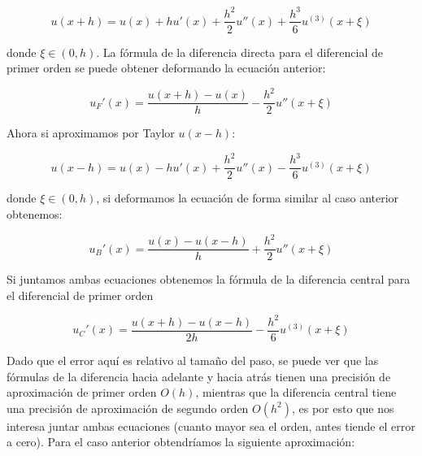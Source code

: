 \documentclass[12pt]{article}
\begin{document}
\begin{equation*}
u(x+h)=u(x) + hu'(x)+ \frac{h^2}{2}  u''(x)+ \frac{h^3}{6} u^{(3)}(x+\xi) 
\end{equation*}

donde $\xi\in (0,h)$. La fórmula de la diferencia directa para el diferencial de primer orden se puede obtener deformando la ecuación anterior:

\begin{equation}
u_F'(x)=\frac{u(x+h)-u(x)}{h} - \frac{h^2}{2}u''(x+\xi)
\end{equation}

Ahora si aproximamos por Taylor $u(x-h)$:

\begin{equation*}
u(x-h)=u(x) - hu'(x)+ \frac{h^2}{2}  u''(x) - \frac{h^3}{6} u^{(3)}(x+\xi)
\end{equation*}

donde $\xi\in (0,h)$, si deformamos la ecuación de forma similar al caso anterior obtenemos:

\begin{equation}
u_B'(x)=\frac{u(x)-u(x-h)}{h} + \frac{h^2}{2}u''(x+\xi)
\end{equation}

Si juntamos ambas ecuaciones obtenemos la fórmula de la diferencia central para el diferencial de primer orden

\begin{equation}
u_C'(x)=\frac{u(x+h)-u(x-h)}{2h} - \frac{h^2}{6}u^{(3)}(x+\xi)
\end{equation}

Dado que el error aquí es relativo al tamaño del paso, se puede ver que las fórmulas de la diferencia hacia adelante y hacia atrás tienen una precisión de aproximación de primer orden $O(h)$, mientras que la diferencia central tiene una precisión de aproximación de segundo orden $O(h^2)$, es por esto que nos interesa juntar ambas ecuaciones (cuanto mayor sea el orden, antes tiende el error a cero). Para el caso anterior obtendríamos la siguiente aproximación:\\

\begin{center}
\end{center}
\end{document}
